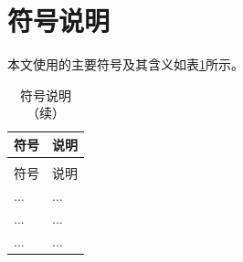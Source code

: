
\section{符号说明}

本文使用的主要符号及其含义如表\ref{tab:符号说明}所示。

\begin{longtable}{>{\centering\arraybackslash}p{}>{\centering\arraybackslash}p{}}
  \caption{符号说明}
  \label{tab:符号说明} \\
  \toprule
  符号 & 说明 \\
  \midrule
  \endfirsthead
  \caption{符号说明（续）} \\
  \toprule
  符号 & 说明 \\
  \midrule
  \endhead
  \bottomrule
  \endfoot
  ... & ... \\
  ... & ... \\
  ... & ...
\end{longtable}

